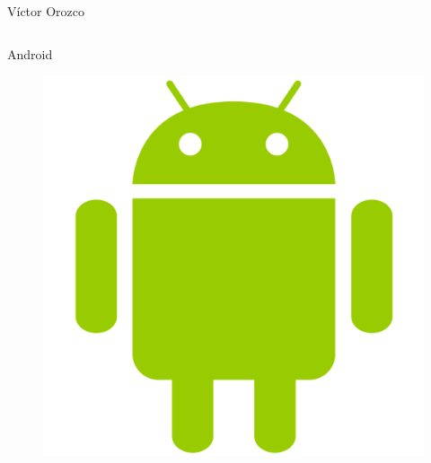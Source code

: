 \documentclass{beamer}
\begin{document}
\begin{frame}{Víctor Orozco}
\begin{columns}[T]
\begin{column}[T]{5cm}
	     \end{column}
     \end{columns}
\end{frame}

\begin{frame}{Android}
            \begin{figure}
                \centering
                \includegraphics[width=0.7\linewidth]{Images/andlogo}
            \end{figure}    
\end{frame}
\end{document}
